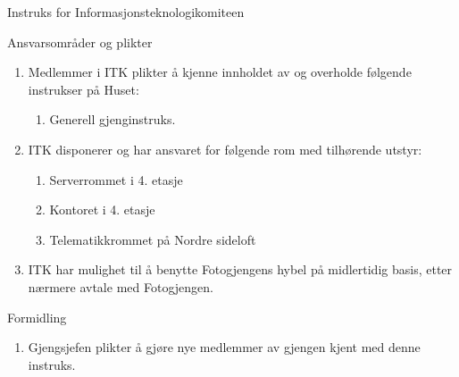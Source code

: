 \begin{instruks}{Instruks for Informasjonsteknologikomiteen}{}{}
    \begin{instruksledd}{Ansvarsområder og plikter}
        \begin{enumerate}
            \item Medlemmer i ITK plikter å kjenne innholdet av og overholde følgende instrukser på Huset:
                \begin{enumerate}
                    \item  Generell gjenginstruks.
                \end{enumerate}
            \item ITK disponerer og har ansvaret for følgende rom med tilhørende utstyr:
                \begin{enumerate}
                    \item Serverrommet i 4. etasje
                    \item Kontoret i 4. etasje
                    \item Telematikkrommet på Nordre sideloft
                \end{enumerate}
            \item ITK har mulighet til å benytte Fotogjengens hybel på midlertidig basis, etter nærmere
                 avtale med Fotogjengen.
        \end{enumerate}
    \end{instruksledd}

    \begin{instruksledd}{Formidling}
        \begin{enumerate}
            \item Gjengsjefen plikter å gjøre nye medlemmer av gjengen kjent med denne
                instruks.
        \end{enumerate}
    \end{instruksledd}


\end{instruks}
